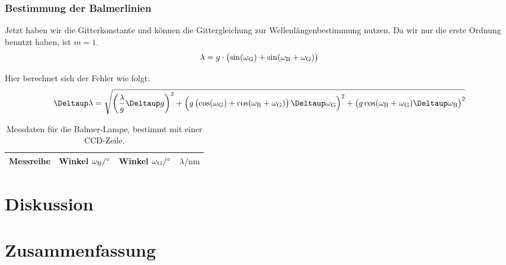 
\FloatBarrier
\subsubsection{Bestimmung der Balmerlinien}

Jetzt haben wir die Gitterkonstante und können die Gittergleichung zur
Wellenlängenbestimmung nutzen. Da wir nur die erste Ordnung benutzt haben, ist
$m = 1$.
\[
    \lambda =
    g \cdot \del{\sin(\omega_\text G) + \sin(\omega_\text B + \omega_\text G)}
\]

Hier berechnet sich der Fehler wie folgt:
\[
    \Deltaup \lambda
    =
    \sqrt{
        \del{\frac{\lambda}g \Deltaup g}^2
        +
        \del{g \del{\cos(\omegaG) + \cos(\omegaB + \omegaG)} \Deltaup
        \omegaG}^2
        +
        \del{g \cos(\omegaB + \omegaG) \Deltaup \omegaB}^2
    }
\]

\begin{table}[htbp]
    \centering
    \begin{tabular}{SSSS}
        {Messreihe} & {Winkel $\omegaB / \si\degree$}  & {Winkel $\omegaG /
    \si\degree$} & {$\lambda/\si{\nano\meter}$} \\
        \hline
    \end{tabular}
    \caption{%
        Messdaten für die Balmer-Lampe, bestimmt mit einer CCD-Zeile.
    }
    \label{tab:messdaten:balmer-wellenlängen}
\end{table}


\FloatBarrier
\section{Diskussion}


\FloatBarrier
\section{Zusammenfassung}

